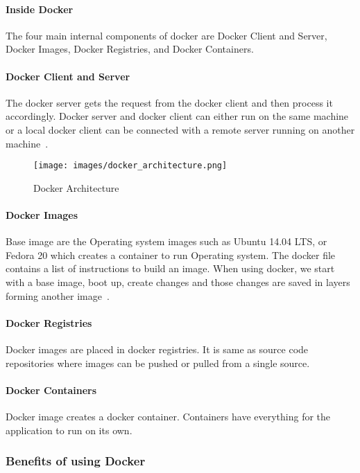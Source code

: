 	
	\paragraph{Inside Docker}
	The four main internal components of docker are Docker Client and
  Server, Docker Images, Docker Registries, and Docker Containers.

	\paragraph{Docker Client and Server}
	The docker server gets the request from the docker client and
  then process it accordingly. Docker server and docker client 
  can either run on the same machine or a local docker client
  can be connected with a remote server running on another
  machine~\cite{turnbull2014docker}.
	
	\begin{figure}
		\centering
		\texttt{[image: images/docker\_architecture.png]}
		\caption{Docker Architecture~\cite{turnbull2014docker}} \label{fig:figure1} 
	\end{figure}
    
	\paragraph{Docker Images}
	Base image are the Operating system images such as Ubuntu 14.04 LTS,
  or Fedora 20 which creates a container to run Operating system.  The
  docker file contains a list of instructions to build an image.  When
  using docker, we start with a base image, boot up, create changes
  and those changes are saved in layers forming another
  image~\cite{rad2017introduction}.
  
	\paragraph{Docker Registries}
	Docker images are placed in docker registries. It is same as source
  code repositories where images can be pushed or pulled from a single
  source.
	
  \paragraph{Docker Containers}
	Docker image creates a docker container. Containers have everything
  for the application to run on its own.
	
	\subsubsection{Benefits of using Docker}
  
